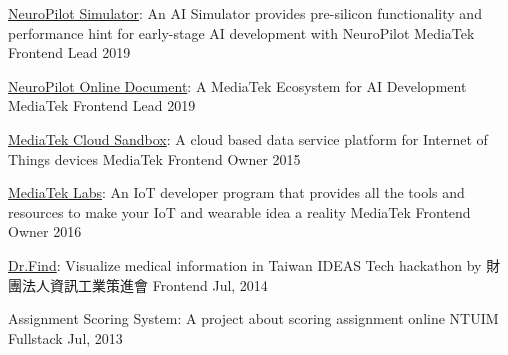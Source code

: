 
\begin{cvhonors}

  \cvhonor
    {\href{https://neuropilot.mediatek.com/}{NeuroPilot Simulator}: \textmd{An AI Simulator provides pre-silicon functionality and performance hint for early-stage AI development with NeuroPilot}} %
    {MediaTek} %
    {Frontend Lead} %
    {2019} %

  \cvhonor
    {\href{https://neuropilot.mediatek.com/}{NeuroPilot Online Document}: \textmd{A MediaTek Ecosystem for AI Development}} %
    {MediaTek} %
    {Frontend Lead} %
    {2019} %

  \cvhonor
    {\href{https://mcs.mediatek.com/}{MediaTek Cloud Sandbox}: \textmd{A cloud based data service platform for Internet of Things devices}} %
    {MediaTek} %
    {Frontend Owner} %
    {2015} %

  \cvhonor
    {\href{https://labs.mediatek.com/}{MediaTek Labs}: \textmd{An IoT developer program that provides all the tools and resources to make your IoT and wearable idea a reality}} %
    {MediaTek} %
    {Frontend Owner} %
    {2016} %

  \cvhonor
    {\href{https://kdchang.cc/Dr.Find}{Dr.Find}: \textmd{Visualize medical information in Taiwan}} %
    {IDEAS Tech hackathon by 財團法人資訊工業策進會} %
    {Frontend} %
    {Jul, 2014} %

  \cvhonor
    {Assignment Scoring System: \textmd{A project about scoring assignment online}} %
    {NTUIM} %
    {Fullstack} %
    {Jul, 2013} %


\end{cvhonors}
